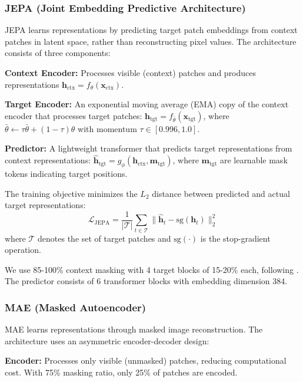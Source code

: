 \documentclass[11pt,a4paper]{article}
\begin{document}
\subsubsection{JEPA (Joint Embedding Predictive Architecture)}

JEPA learns representations by predicting target patch embeddings from context patches in latent space, rather than reconstructing pixel values. The architecture consists of three components:

\textbf{Context Encoder:} Processes visible (context) patches and produces representations $\mathbf{h}_{\text{ctx}} = f_\theta(\mathbf{x}_{\text{ctx}})$.

\textbf{Target Encoder:} An exponential moving average (EMA) copy of the context encoder that processes target patches: $\mathbf{h}_{\text{tgt}} = f_{\bar{\theta}}(\mathbf{x}_{\text{tgt}})$, where $\bar{\theta} \leftarrow \tau \bar{\theta} + (1-\tau) \theta$ with momentum $\tau \in [0.996, 1.0]$.

\textbf{Predictor:} A lightweight transformer that predicts target representations from context representations: $\hat{\mathbf{h}}_{\text{tgt}} = g_\phi(\mathbf{h}_{\text{ctx}}, \mathbf{m}_{\text{tgt}})$, where $\mathbf{m}_{\text{tgt}}$ are learnable mask tokens indicating target positions.

The training objective minimizes the $L_2$ distance between predicted and actual target representations:
\begin{equation}
    \mathcal{L}_{\text{JEPA}} = \frac{1}{|\mathcal{T}|} \sum_{t \in \mathcal{T}} \|\hat{\mathbf{h}}_t - \text{sg}(\mathbf{h}_t)\|_2^2
\end{equation}
where $\mathcal{T}$ denotes the set of target patches and $\text{sg}(\cdot)$ is the stop-gradient operation.

We use 85-100\% context masking with 4 target blocks of 15-20\% each, following \citet{assran2023self}. The predictor consists of 6 transformer blocks with embedding dimension 384.

\subsubsection{MAE (Masked Autoencoder)}

MAE learns representations through masked image reconstruction. The architecture uses an asymmetric encoder-decoder design:

\textbf{Encoder:} Processes only visible (unmasked) patches, reducing computational cost. With 75\% masking ratio, only 25\% of patches are encoded.
\end{document}
